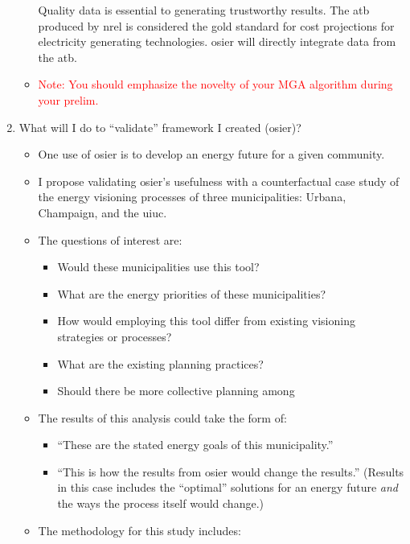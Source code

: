 \begin{enumerate}
\begin{itemize}
        Quality data is essential to generating trustworthy results. The
        \ac{atb} produced by \ac{nrel} is considered the gold standard for cost
        projections for electricity generating technologies. \ac{osier} will
        directly integrate data from the \ac{atb}.
        \item \textcolor{red}{Note: You should emphasize the novelty of your MGA
        algorithm during your prelim.}
    \end{itemize}
    \item What will I do to ``validate'' framework I created (\ac{osier})?
    \begin{itemize}
        \item One use of \ac{osier} is to develop an energy future for a given
        community. 
        \item I propose validating \ac{osier}'s usefulness with a counterfactual
        case study of the energy visioning processes of three municipalities:
        Urbana, Champaign, and the \ac{uiuc}.
        \item The questions of interest are:
        \begin{itemize}
            \item Would these municipalities use this tool?
            \item What are the energy priorities of these municipalities?
            \item How would employing this tool differ from existing visioning
            strategies or processes?
            \item What are the existing planning practices?
            \item Should there be more collective planning among
        \end{itemize}
        \item The results of this analysis could take the form of:
        \begin{itemize}
            \item ``These are the stated energy goals of this municipality.''
            \item ``This is how the results from \ac{osier} would change the
            results.'' (Results in this case includes the ``optimal'' solutions
            for an energy future \textit{and} the ways the process itself would
            change.)
        \end{itemize}
        \item The methodology for this study includes:
        \begin{itemize}

\end{itemize}
\end{itemize}
\end{enumerate}
